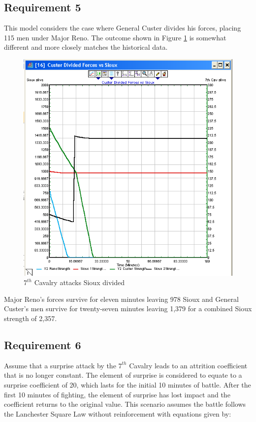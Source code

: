 \documentclass[letterpaper,10pt]{article}
\begin{document}
\subsection{Requirement 5}
This model considers the case where General Custer divides his forces, placing 115 men under Major Reno.  The outcome shown in Figure \ref{fig5a} is somewhat different and more closely matches the historical data.
\begin{figure}[h!tp]
\begin{center}
\includegraphics[scale=0.4]{fig5a.png}
\caption{$7^{th}$ Cavalry attacks Sioux divided}
\label{fig5a}
\end{center}
\end{figure}

Major Reno's forces survive for eleven minutes leaving 978 Sioux and General Custer's men survive for twenty-seven minutes leaving 1,379 for a combined Sioux strength of 2,357.

\subsection{Requirement 6}
Assume that a surprise attack by the $7^{th}$ Cavalry leads to an attrition coefficient that is no longer constant.   The element of surprise is considered to equate to a surprise coefficient of 20, which lasts for the initial 10 minutes of battle.  After the first 10 minutes of fighting, the element of surprise has lost impact and the coefficient returns to the original value.  This scenario assumes the battle follows the Lanchester Square Law without reinforcement with equations given by:
\end{document}
